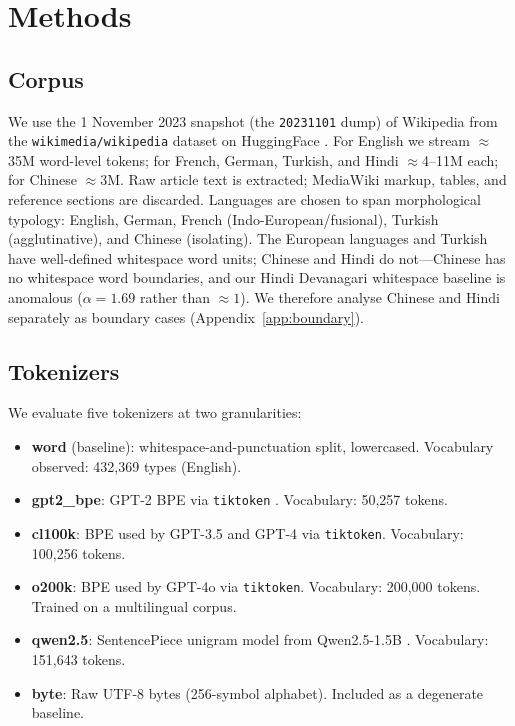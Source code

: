\documentclass{article}
\begin{document}

\section{Methods}
\label{sec:methods}

\subsection{Corpus}
\label{sec:corpus}

We use the 1 November 2023 snapshot (the \texttt{20231101} dump) of Wikipedia from the
\texttt{wikimedia/wikipedia} dataset on HuggingFace \citep{wikimediawikipedia}. For
English we stream $\approx$35M word-level tokens; for French, German, Turkish, and Hindi
$\approx$4--11M each; for Chinese $\approx$3M. Raw article text is extracted; MediaWiki
markup, tables, and reference sections are discarded. Languages are chosen to span
morphological typology: English, German, French (Indo-European/fusional), Turkish
(agglutinative), and Chinese (isolating). The European languages and Turkish have
well-defined whitespace word units; Chinese and Hindi do not---Chinese has no whitespace
word boundaries, and our Hindi Devanagari whitespace baseline is anomalous
($\alpha = 1.69$ rather than $\approx 1$). We therefore analyse Chinese and Hindi
separately as boundary cases (Appendix~\ref{app:boundary}).

\subsection{Tokenizers}
\label{sec:tokenizers}

We evaluate five tokenizers at two granularities:

\begin{itemize}
  \item \textbf{word} (baseline): whitespace-and-punctuation split, lowercased.
    Vocabulary observed: 432,369 types (English).
  \item \textbf{gpt2\_bpe}: GPT-2 BPE via \texttt{tiktoken} \citep{tiktoken}.
    Vocabulary: 50,257 tokens.
  \item \textbf{cl100k}: BPE used by GPT-3.5 and GPT-4 via \texttt{tiktoken}.
    Vocabulary: 100,256 tokens.
  \item \textbf{o200k}: BPE used by GPT-4o via \texttt{tiktoken}.
    Vocabulary: 200,000 tokens. Trained on a multilingual corpus.
  \item \textbf{qwen2.5}: SentencePiece unigram model from Qwen2.5-1.5B
    \citep{qwen25}. Vocabulary: 151,643 tokens.
  \item \textbf{byte}: Raw UTF-8 bytes (256-symbol alphabet). Included as a
    degenerate baseline.
\end{itemize}
\end{document}
